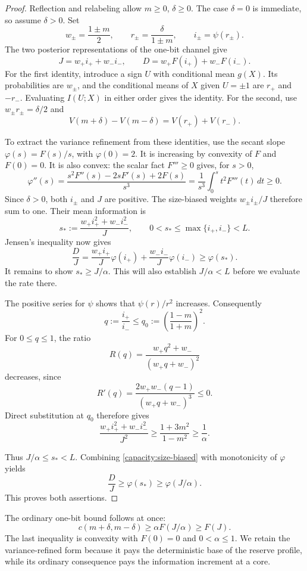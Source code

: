 \begin{proof}
Reflection and relabeling allow $m\ge0$, $\delta\ge0$.  The case
$\delta=0$ is immediate, so assume $\delta>0$.  Set
\[
 w_\pm=\frac{1\pm m}{2},\qquad
 r_\pm=\frac\delta{1\pm m},\qquad i_\pm=\psi(r_\pm).
\]
The two posterior representations of the one-bit channel give
\begin{equation}
 J=w_+i_++w_-i_-,\qquad
 D=w_+F(i_+)+w_-F(i_-).
 \label{capacity:posterior}
\end{equation}
For the first identity, introduce a sign $U$ with conditional mean
$g(X)$.  Its probabilities are $w_\pm$, and the conditional means
of $X$ given $U=\pm1$ are $r_+$ and $-r_-$.  Evaluating
$I(U;X)$ in either order gives the identity.  For the second, use
$w_\pm r_\pm=\delta/2$ and
\[
 V(m+\delta)-V(m-\delta)=V(r_+)+V(r_-).
\]

To extract the variance refinement from these identities, use the
secant slope $\varphi(s)=F(s)/s$, with $\varphi(0)=2$.
It is increasing by convexity of $F$ and $F(0)=0$. It is also
convex: the scalar fact $F'''\ge0$ gives, for $s>0$,
\[
 \varphi''(s)
 =\frac{s^2F''(s)-2sF'(s)+2F(s)}{s^3}
 =\frac1{s^3}\int_0^s t^2F'''(t)\,dt\ge0.
\]
Since $\delta>0$, both $i_\pm$ and $J$ are positive.
The size-biased weights $w_\pm i_\pm/J$ therefore sum to one.
Their mean information is
\[
 s_*:=\frac{w_+i_+^2+w_-i_-^2}{J},\qquad
 0<s_*\le\max\{i_+,i_-\}<L.
\]
Jensen's inequality now gives
\begin{equation}
 \frac DJ
 =\frac{w_+i_+}{J}\varphi(i_+)
  +\frac{w_-i_-}{J}\varphi(i_-)
 \ge\varphi(s_*).
 \label{capacity:size-biased}
\end{equation}
It remains to show $s_*\ge J/\alpha$. This will also establish
$J/\alpha<L$ before we evaluate the rate there.

The positive series for $\psi$ shows that $\psi(r)/r^2$ increases.
Consequently
\[
 q:=\frac{i_+}{i_-}
 \le q_0:=\left(\frac{1-m}{1+m}\right)^2.
\]
For $0\le q\le1$, the ratio
\[
 R(q)=\frac{w_+q^2+w_-}{(w_+q+w_-)^2}
\]
decreases, since
\[
 R'(q)=\frac{2w_+w_-(q-1)}{(w_+q+w_-)^3}\le0.
\]
Direct substitution at $q_0$ therefore gives
\begin{equation}
 \frac{w_+i_+^2+w_-i_-^2}{J^2}
 \ge\frac{1+3m^2}{1-m^2}\ge\frac1\alpha.
 \label{capacity:secondmoment}
\end{equation}

Thus $J/\alpha\le s_*<L$. Combining
\eqref{capacity:size-biased} with monotonicity of $\varphi$ yields
\[
 \frac DJ
 \ge\varphi(s_*)
 \ge\varphi(J/\alpha).
\]
This proves both assertions.
\end{proof}


The ordinary one-bit bound follows at once:
\[
 c(m+\delta,m-\delta)\ge\alpha F(J/\alpha)\ge F(J).
\]
The last inequality is convexity with $F(0)=0$ and $0<\alpha\le1$.
We retain the variance-refined form because it pays the deterministic
base of the reserve profile, while its ordinary consequence pays the
information increment at a core.
